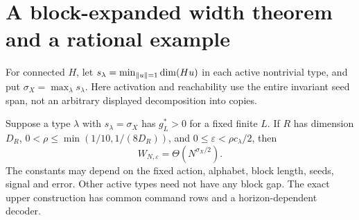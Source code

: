 \section{A block-expanded width theorem and a rational example}\label{sec:block-application}
For connected $H$, let $s_\lambda=\min_{\lVert u\rVert=1}\dim(Hu)$ in each active nontrivial type, and put $\sigma_X=\max_\lambda s_\lambda$. Here activation and reachability use the entire invariant seed span, not an arbitrary displayed decomposition into copies.

\begin{theorem}\label{thm:dominant-block}
Suppose a type $\lambda$ with $s_\lambda=\sigma_X$ has $g_L^*>0$ for a fixed finite $L$. If $R$ has dimension $D_R$, $0<\rho\le\min(1/10,1/(8D_R))$, and $0\le\varepsilon<\rho c_\lambda/2$, then
\begin{equation}\label{eq:block-width}
 W_{N,\varepsilon}=\Theta(N^{\sigma_X/2}).
\end{equation}
The constants may depend on the fixed action, alphabet, block length, seeds, signal and error. Other active types need not have any block gap. The exact upper construction has common command rows and a horizon-dependent decoder.
\end{theorem}
